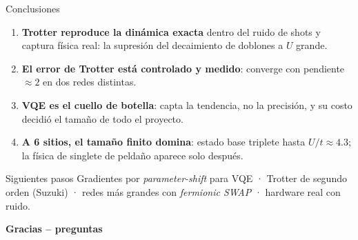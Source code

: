 \documentclass[aspectratio=169,11pt]{beamer}
\newcommand{\good}[1]{\textcolor{qAccent}{\textbf{#1}}}
\newcommand{\warn}[1]{\textcolor{qWarn}{\textbf{#1}}}
\begin{document}
\begin{frame}{Conclusiones}
  \begin{enumerate}
    \item \good{Trotter reproduce la dinámica exacta} dentro del ruido de shots y captura física
      real: la supresión del decaimiento de doblones a $U$ grande.
    \item \good{El error de Trotter está controlado y medido}: converge con pendiente $\approx2$
      en dos redes distintas.
    \item \warn{VQE es el cuello de botella}: capta la tendencia, no la precisión, y su costo
      decidió el tamaño de todo el proyecto.
    \item \warn{A 6 sitios, el tamaño finito domina}: estado base triplete hasta
      $U/t\approx4.3$; la física de singlete de peldaño aparece solo después.
  \end{enumerate}
  \vspace{0.4em}
  \begin{block}{Siguientes pasos}
    Gradientes por \emph{parameter-shift} para VQE \;·\; Trotter de segundo orden (Suzuki)
    \;·\; redes más grandes con \emph{fermionic SWAP} \;·\; hardware real con ruido.
  \end{block}
  \vfill
  \centering \large \textcolor{qDeep}{\textbf{Gracias -- preguntas}}
\end{frame}
\end{document}
